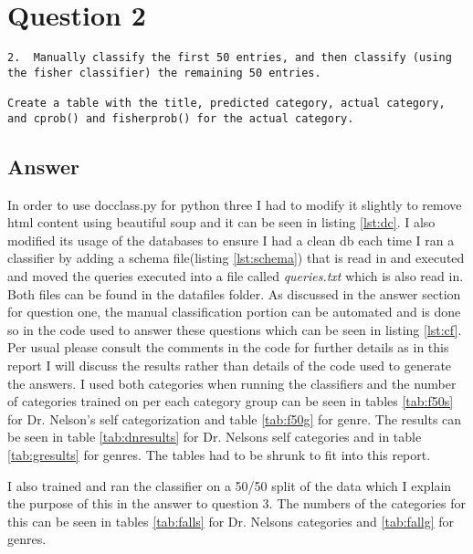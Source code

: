 \documentclass[letterpaper,10pt]{article}
\begin{document}
\section*{Question 2}
\begin{verbatim}
2.  Manually classify the first 50 entries, and then classify (using
the fisher classifier) the remaining 50 entries. 

Create a table with the title, predicted category, actual category,
and cprob() and fisherprob() for the actual category.
\end{verbatim}
\subsection*{Answer}
In order to use docclass.py for python three I had to modify it slightly to remove html content using beautiful soup and it can be seen in listing \hyperref[lst:dc]{\ref{lst:dc}}. I also modified its usage of the databases to ensure I had a clean db each time I ran a classifier by adding a schema file(listing \hyperref[lst:schema]{\ref{lst:schema}}) that is read in and executed and moved the queries executed into a file called \emph{queries.txt} which is also read in. Both files can be found in the datafiles folder. \newline \newline
As discussed in the answer section for question one, the manual classification portion can be automated and is done so in the code used to answer these questions which can be seen in listing \hyperref[lst:cf]{\ref{lst:cf}}. Per usual please consult the comments in the code for further details as in this report I will discuss the results rather than details of the code used to generate the answers.\newline \newline
I used both categories when running the classifiers and the number of categories trained on per each category group can be seen in tables \hyperref[tab:f50s]{\ref{tab:f50s}} for Dr. Nelson's self categorization and table \hyperref[tab:f50g]{\ref{tab:f50g}} for genre. The results can be seen in table \hyperref[tab:dnresults]{\ref{tab:dnresults}} for Dr. Nelsons self categories and in table \hyperref[tab:gresults]{\ref{tab:gresults}} for genres. The tables had to be shrunk to fit into this report. \newline \newline

I also trained and ran the classifier on a 50/50 split of the data which I explain the purpose of this in the answer to question 3. The numbers of the categories for this can be seen in tables \hyperref[tab:falls]{\ref{tab:falls}} for Dr. Nelsons categories and \hyperref[tab:fallg]{\ref{tab:fallg}} for genres.
\end{document}

